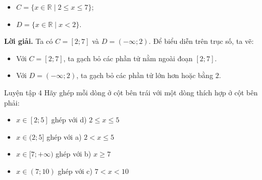 \begin{kienthuc}
\begin{vd}
		\begin{itemize}
			\item[a)] $C = \{x \in \mathbb{R} \mid 2 \le x \le 7\}$;
			\item[b)] $D = \{x \in \mathbb{R} \mid x < 2\}$.
		\end{itemize}
		\textbf{Lời giải.}
		Ta có $C = [2; 7]$ và $D = (-\infty; 2)$. Để biểu diễn trên trục số, ta vẽ:
		\begin{itemize}
			\item Với $C = [2; 7]$, ta gạch bỏ các phần tử nằm ngoài đoạn $[2; 7]$.
			\item Với $D = (-\infty; 2)$, ta gạch bỏ các phần tử lớn hơn hoặc bằng $2$.
		\end{itemize}
	\end{vd}
	\begin{hoatdong}{Luyện tập 4}
		Hãy ghép mỗi dòng ở cột bên trái với một dòng thích hợp ở cột bên phải:
		\begin{itemize}
			\item[1)] $x \in [2; 5]$ ghép với d) $2 \le x \le 5$
			\item[2)] $x \in (2; 5]$ ghép với a) $2 < x \le 5$
			\item[3)] $x \in [7; +\infty)$ ghép với b) $x \ge 7$
			\item[4)] $x \in (7; 10)$ ghép với c) $7 < x < 10$
		\end{itemize}
	\end{hoatdong}
\end{kienthuc}

